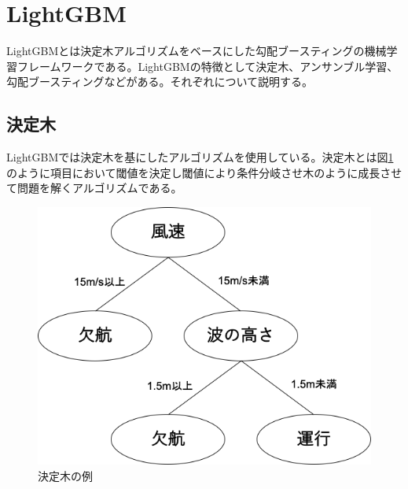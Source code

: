 \section{LightGBM}
LightGBMとは決定木アルゴリズムをベースにした勾配ブースティングの機械学習フレームワークである。LightGBMの特徴として決定木、アンサンブル学習、勾配ブースティングなどがある。それぞれについて説明する。
\subsection{決定木}
LightGBMでは決定木を基にしたアルゴリズムを使用している。決定木とは図\ref{kettei}のように項目において閾値を決定し閾値により条件分岐させ木のように成長させて問題を解くアルゴリズムである。
\begin{figure}[H]
 \centering
 \includegraphics[keepaspectratio, scale=0.6]{fig/chapter2/ketteigi.png}
 \caption{決定木の例}
 \label{kettei}
\end{figure}

